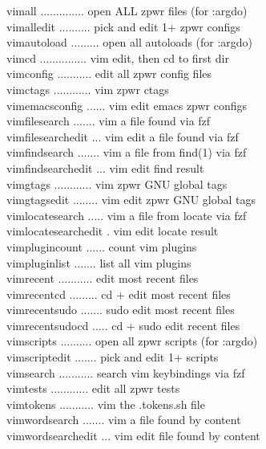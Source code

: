 \documentclass[11pt,a4paper,twoside]{book}
\begin{document}
\begin{codebox}
\color{neongreen}vimall .............. open ALL zpwr files (for :argdo)\\
\color{neongreen}vimalledit .......... pick and edit 1+ zpwr configs\\
\color{neongreen}vimautoload ......... open all autoloads (for :argdo)\\
\color{neongreen}vimcd ............... vim edit, then cd to first dir\\
\color{neongreen}vimconfig ........... edit all zpwr config files\\
\color{neongreen}vimctags ............ vim zpwr ctags\\
\color{neongreen}vimemacsconfig ...... vim edit emacs zpwr configs\\
\color{neongreen}vimfilesearch ....... vim a file found via fzf\\
\color{neongreen}vimfilesearchedit ... vim edit a file found via fzf\\
\color{neongreen}vimfindsearch ....... vim a file from find(1) via fzf\\
\color{neongreen}vimfindsearchedit ... vim edit find result\\
\color{neongreen}vimgtags ............ vim zpwr GNU global tags\\
\color{neongreen}vimgtagsedit ........ vim edit zpwr GNU global tags\\
\color{neongreen}vimlocatesearch ..... vim a file from locate via fzf\\
\color{neongreen}vimlocatesearchedit . vim edit locate result\\
\color{neongreen}vimplugincount ...... count vim plugins\\
\color{neongreen}vimpluginlist ....... list all vim plugins\\
\color{neongreen}vimrecent ........... edit most recent files\\
\color{neongreen}vimrecentcd ......... cd + edit most recent files\\
\color{neongreen}vimrecentsudo ....... sudo edit most recent files\\
\color{neongreen}vimrecentsudocd ..... cd + sudo edit recent files\\
\color{neongreen}vimscripts .......... open all zpwr scripts (for :argdo)\\
\color{neongreen}vimscriptedit ....... pick and edit 1+ scripts\\
\color{neongreen}vimsearch ........... search vim keybindings via fzf\\
\color{neongreen}vimtests ............ edit all zpwr tests\\
\color{neongreen}vimtokens ........... vim the .tokens.sh file\\
\color{neongreen}vimwordsearch ....... vim a file found by content\\
\color{neongreen}vimwordsearchedit ... vim edit file found by content\\
\end{codebox}
\end{document}
